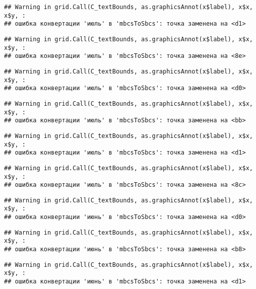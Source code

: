 \documentclass[
]{article}
\begin{document}
\begin{verbatim}
## Warning in grid.Call(C_textBounds, as.graphicsAnnot(x$label), x$x, x$y, :
## ошибка конвертации 'июль' в 'mbcsToSbcs': точка заменена на <d1>
\end{verbatim}

\begin{verbatim}
## Warning in grid.Call(C_textBounds, as.graphicsAnnot(x$label), x$x, x$y, :
## ошибка конвертации 'июль' в 'mbcsToSbcs': точка заменена на <8e>
\end{verbatim}

\begin{verbatim}
## Warning in grid.Call(C_textBounds, as.graphicsAnnot(x$label), x$x, x$y, :
## ошибка конвертации 'июль' в 'mbcsToSbcs': точка заменена на <d0>
\end{verbatim}

\begin{verbatim}
## Warning in grid.Call(C_textBounds, as.graphicsAnnot(x$label), x$x, x$y, :
## ошибка конвертации 'июль' в 'mbcsToSbcs': точка заменена на <bb>
\end{verbatim}

\begin{verbatim}
## Warning in grid.Call(C_textBounds, as.graphicsAnnot(x$label), x$x, x$y, :
## ошибка конвертации 'июль' в 'mbcsToSbcs': точка заменена на <d1>
\end{verbatim}

\begin{verbatim}
## Warning in grid.Call(C_textBounds, as.graphicsAnnot(x$label), x$x, x$y, :
## ошибка конвертации 'июль' в 'mbcsToSbcs': точка заменена на <8c>
\end{verbatim}

\begin{verbatim}
## Warning in grid.Call(C_textBounds, as.graphicsAnnot(x$label), x$x, x$y, :
## ошибка конвертации 'июнь' в 'mbcsToSbcs': точка заменена на <d0>
\end{verbatim}

\begin{verbatim}
## Warning in grid.Call(C_textBounds, as.graphicsAnnot(x$label), x$x, x$y, :
## ошибка конвертации 'июнь' в 'mbcsToSbcs': точка заменена на <b8>
\end{verbatim}

\begin{verbatim}
## Warning in grid.Call(C_textBounds, as.graphicsAnnot(x$label), x$x, x$y, :
## ошибка конвертации 'июнь' в 'mbcsToSbcs': точка заменена на <d1>
\end{verbatim}
\end{document}
